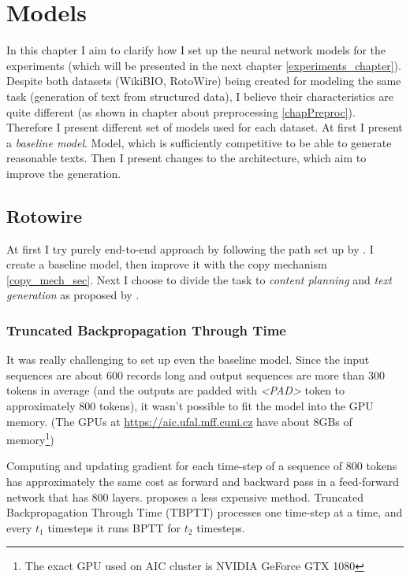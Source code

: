 \chapter{Models} \label{model_chapter}
In this chapter I aim to clarify how I set up the neural network models for the experiments (which will be presented in the next chapter \ref{experiments_chapter}). Despite both datasets (WikiBIO, RotoWire) being created for modeling the same task (generation of text from structured data), I believe their characteristics are quite different (as shown in chapter about preprocessing \ref{chapPreproc}). Therefore I present different set of models used for each dataset. At first I present a \emph{baseline model}. Model, which is sufficiently competitive to be able to generate reasonable texts. Then I present changes to the architecture, which aim to improve the generation.

\section{Rotowire}

At first I try purely end-to-end approach by following the path set up by \citep{wiseman2017}. I create a baseline model, then improve it with the copy mechanism \ref{copy_mech_sec}. Next I choose to divide the task to \emph{content planning} and \emph{text generation} as proposed by \citep{puduppully2019datatotext}.

\subsection{Truncated Backpropagation Through Time} \label{truncated_backprop_subsection}

It was really challenging to set up even the baseline model. Since the input sequences are about 600 records long and output sequences are more than 300 tokens in average (and the outputs are padded with \emph{\textless PAD\textgreater} token to approximately 800 tokens), it wasn't possible to fit the model into the GPU memory. (The GPUs at \url{https://aic.ufal.mff.cuni.cz} have about 8GBs of memory\footnote{The exact GPU used on AIC cluster is NVIDIA GeForce GTX 1080})

Computing and updating gradient for each time-step of a sequence of 800 tokens has approximately the same cost as forward and backward pass in a feed-forward network that has 800 layers. \citep{williamsTBPTT} proposes a less expensive method. Truncated Backpropagation Through Time (TBPTT) processes one time-step at a time, and every $t_1$ timesteps it runs BPTT for $t_2$ timesteps.

